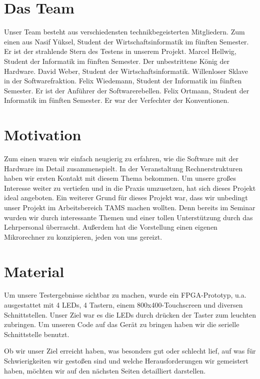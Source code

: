 \section{Das Team}
Unser Team besteht aus verschiedensten technikbegeisterten Mitgliedern. Zum einen aus Nasif Yüksel, Student der Wirtschaftsinformatik im fünften Semester. Er ist der strahlende Stern des Testens in unserem Projekt. Marcel Hellwig, Student der Informatik im fünften Semester. Der unbestrittene König der Hardware. David Weber, Student der Wirtschaftsinformatik. Willenloser Sklave in der Softwarefraktion. Felix Wiedemann, Student der Informatik im fünften Semester. Er ist der Anführer der Softwarerebellen. Felix Ortmann, Student der Informatik im fünften Semester. Er war der Verfechter der Konventionen. 

\section{Motivation}
Zum einen waren wir einfach neugierig zu erfahren, wie die Software mit der Hardware im Detail zusammenspielt. In der Veranstaltung Rechnerstrukturen haben wir ersten Kontakt mit diesem Thema bekommen. Um unsere großes Interesse weiter zu vertiefen und in die Praxis umzusetzen, hat sich dieses Projekt ideal angeboten.
Ein weiterer Grund für dieses Projekt war, dass wir unbedingt unser Projekt im Arbeitsbereich TAMS machen wollten. Denn bereits im Seminar wurden wir durch interessante Themen und einer tollen Unterstützung durch das Lehrpersonal überrascht.
Außerdem hat die Vorstellung einen eigenen Mikrorechner zu konzipieren, jeden von uns gereizt.

\section{Material}
Um unsere Testergebnisse sichtbar zu machen, wurde ein FPGA-Prototyp, u.a. ausgestattet mit 4 LEDs, 4 Tastern, einem 800x400-Touchscreen und diversen Schnittstellen. Unser Ziel war es die LEDs durch drücken der Taster zum leuchten zubringen. Um unseren Code auf das Gerät zu bringen haben wir die serielle Schnittstelle benutzt.

Ob wir unser Ziel erreicht haben, was besonders gut oder schlecht lief, auf was für Schwierigkeiten wir gestoßen sind und welche Herausforderungen wir gemeistert haben, möchten wir auf den nächsten Seiten detailliert darstellen.




